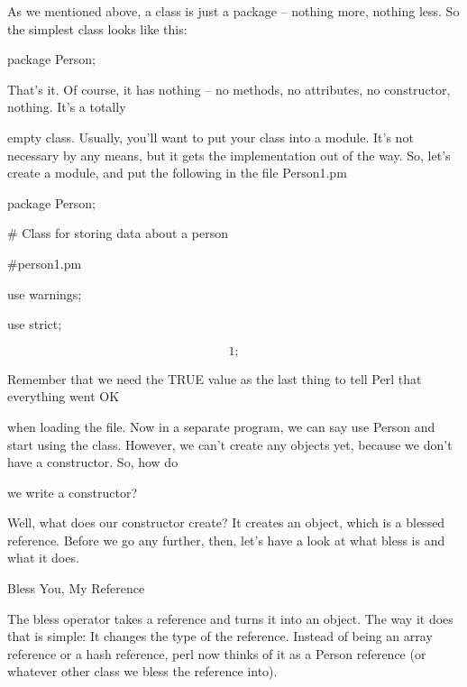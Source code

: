 \documentclass[a4paper,11pt]{book}
\begin{document}
\noindent 

\noindent As we mentioned above, a class is just a package -- nothing more, nothing less. So the simplest class looks like this:

\noindent 

\noindent package Person;

\noindent 

\noindent That's it. Of course, it has nothing -- no methods, no attributes, no constructor, nothing. It's a totally

\noindent empty class. Usually, you'll want to put your class into a module. It's not necessary by any means, but it gets the implementation out of the way. So, let's create a module, and put the following in the file Person1.pm

\noindent 

\noindent package Person;

\noindent \# Class for storing data about a person

\noindent \#person1.pm

\noindent use warnings;

\noindent use strict;

\noindent 

\[1;\] 


\noindent Remember that we need the  TRUE value  as  the  last  thing  to  tell  Perl  that  everything  went  OK

\noindent when loading the file.  Now  in  a  separate  program,  we can  say  use Person and  start  using  the class.  However,  we can't  create  any  objects  yet,  because  we don't  have  a  constructor.  So,  how  do

\noindent we write a constructor?

\noindent 

\noindent Well,  what does our constructor create? It creates an object, which is a blessed reference. Before we go any further, then, let's have a look at what bless is and what it does.

\noindent 

\noindent Bless You, My Reference

\noindent The bless operator takes a reference and turns it into an object. The way it does that is simple: It changes the type of the reference. Instead of being an array reference or a hash reference, perl now thinks of it as a Person reference (or whatever other class we bless the reference into).

\noindent 
\end{document}
